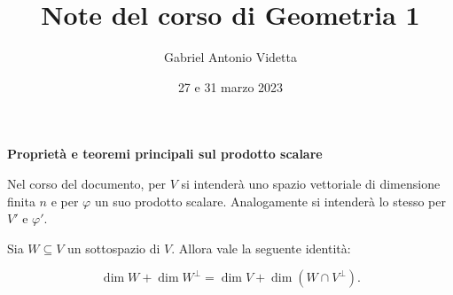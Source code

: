 \documentclass[11pt]{article}
\title{\textbf{Note del corso di Geometria 1}}
\author{Gabriel Antonio Videtta}
\date{27 e 31 marzo 2023}
\begin{document}
	
	\maketitle
	
	\begin{center}
		\Large \textbf{Proprietà e teoremi principali sul prodotto scalare}
	\end{center}
	
	\begin{note}
		Nel corso del documento, per $V$ si intenderà uno spazio vettoriale di dimensione
		finita $n$ e per $\varphi$ un suo prodotto scalare. Analogamente si intenderà lo stesso
		per $V'$ e $\varphi'$.
	\end{note}
	
	\begin{proposition}
		Sia $W \subseteq V$ un sottospazio di $V$. Allora vale la seguente identità:
		
		\[ \dim W + \dim W^\perp = \dim V + \dim (W \cap V^\perp). \]
	\end{proposition}
\end{document}
